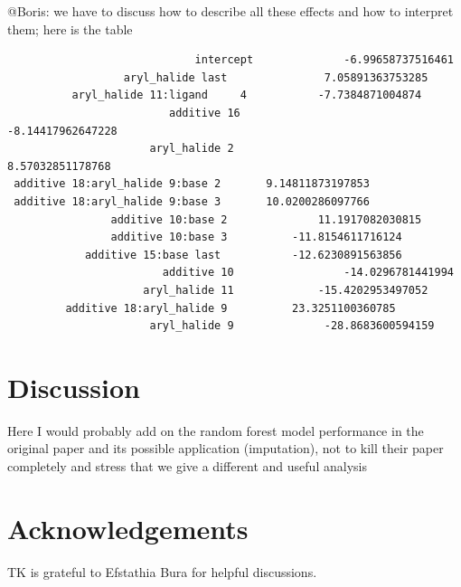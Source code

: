 \documentclass[12pt]{article}
\newcommand{\biblist}{


}
\begin{document}
{\color{red} @Boris: we have to discuss how to describe all these effects and how to interpret them; here is the table}
\begin{verbatim}
	                         intercept 				-6.99658737516461
                  aryl_halide last 				 7.05891363753285
          aryl_halide 11:ligand 	4  			-7.7384871004874
                         additive 16 					-8.14417962647228
                      aryl_halide 2 					 8.57032851178768
 additive 18:aryl_halide 9:base 2  		9.14811873197853
 additive 18:aryl_halide 9:base 3  		10.0200286097766
                additive 10:base 2  			11.1917082030815
                additive 10:base 3 			-11.8154611716124
            additive 15:base last 			-12.6230891563856
                        additive 10 				-14.0296781441994
                     aryl_halide 11 			-15.4202953497052
         additive 18:aryl_halide 9  	   	23.3251100360785
                      aryl_halide 9				 -28.8683600594159
\end{verbatim}

\label{subsec:stat_model}
\section{Discussion}
{\color{red} Here I would probably add on the random forest model performance in the original paper and its possible application (imputation), not to kill their paper completely and stress that we give a different and useful analysis}
\label{sec:discussion}


\section*{Acknowledgements}
TK is grateful to Efstathia Bura for helpful discussions.

\begin{appendix}
\label{appendix}
\end{appendix}

\biblist
\end{document}
